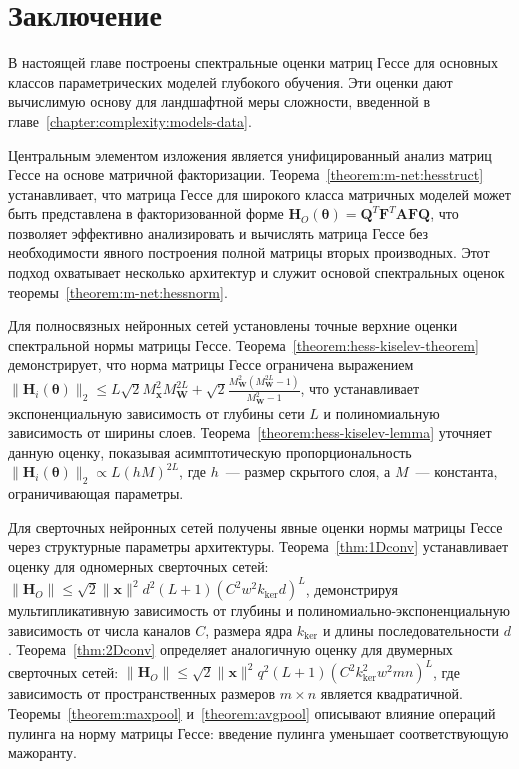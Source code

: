 \section{Заключение}
В настоящей главе построены спектральные оценки матриц Гессе для основных классов параметрических моделей глубокого обучения.
Эти оценки дают вычислимую основу для ландшафтной меры сложности, введенной в главе~\ref{chapter:complexity:models-data}.

Центральным элементом изложения является унифицированный анализ матриц Гессе на основе матричной факторизации.
Теорема~\ref{theorem:m-net:hesstruct} устанавливает, что матрица Гессе для широкого класса матричных моделей может быть представлена в факторизованной форме $\mathbf{H}_O(\boldsymbol{\theta}) = \mathbf{Q}^T\mathbf{F}^T\mathbf{A}\mathbf{F}\mathbf{Q}$, что позволяет эффективно анализировать и вычислять матрица Гессе без необходимости явного построения полной матрицы вторых производных.
Этот подход охватывает несколько архитектур и служит основой спектральных оценок теоремы~\ref{theorem:m-net:hessnorm}.

Для полносвязных нейронных сетей установлены точные верхние оценки спектральной нормы матрицы Гессе.
Теорема~\ref{theorem:hess-kiselev-theorem} демонстрирует, что норма матрицы Гессе ограничена выражением $\|\mathbf{H}_i(\boldsymbol{\theta})\|_2 \leqslant L\sqrt{2}M_{\mathbf{x}}^2M_{\mathbf{W}}^{2L} + \sqrt{2}\frac{M_{\mathbf{W}}^2(M_{\mathbf{W}}^{2L}-1)}{M_{\mathbf{W}}^2-1}$, что устанавливает экспоненциальную зависимость от глубины сети $L$ и полиномиальную зависимость от ширины слоев.
Теорема~\ref{theorem:hess-kiselev-lemma} уточняет данную оценку, показывая асимптотическую пропорциональность $\|\mathbf{H}_i(\boldsymbol{\theta})\|_2 \propto L(hM)^{2L}$, где $h$~--- размер скрытого слоя, а $M$~--- константа, ограничивающая параметры.

Для сверточных нейронных сетей получены явные оценки нормы матрицы Гессе через структурные параметры архитектуры.
Теорема~\ref{thm:1Dconv} устанавливает оценку для одномерных сверточных сетей: $\|\mathbf{H}_O\| \leqslant \sqrt{2}\|\mathbf{x}\|^2d^2(L+1)(C^2w^2k_{\mathrm{ker}}d)^L$, демонстрируя мультипликативную зависимость от глубины и полиномиально-экспоненциальную зависимость от числа каналов $C$, размера ядра $k_{\mathrm{ker}}$ и длины последовательности $d$.
Теорема~\ref{thm:2Dconv} определяет аналогичную оценку для двумерных сверточных сетей: $\|\mathbf{H}_O\| \leqslant \sqrt{2}\|\mathbf{x}\|^2q^2(L+1)(C^2k_{\mathrm{ker}}^2w^2mn)^L$, где зависимость от пространственных размеров $m \times n$ является квадратичной.
Теоремы~\ref{theorem:maxpool} и~\ref{theorem:avgpool} описывают влияние операций пулинга на норму матрицы Гессе: введение пулинга уменьшает соответствующую мажоранту.

